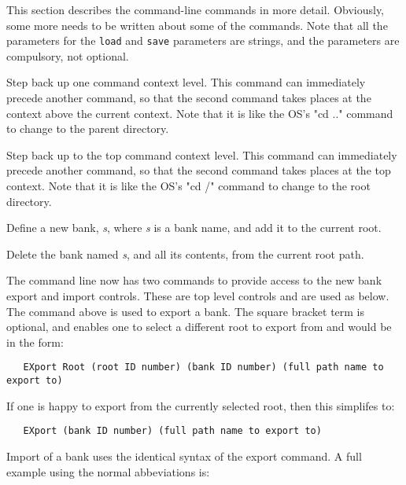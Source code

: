    This section describes the command-line commands in more detail.
   Obviously, some more needs to be written about some of the commands.
   Note that all the parameters for the \texttt{load} and \texttt{save}
   parameters are strings, and the parameters are compulsory, not optional.

   \setcounter{ItemCounter}{0}      %

      Step back up one command context level.
      This command can immediately precede another command, so that the second
      command takes places at the context above the current context.
      Note that it is like the OS's "cd .." command to change to the parent
      directory.

      Step back up to the top command context level.
      This command can immediately precede another command, so that the second
      command takes places at the top context.
      Note that it is like the OS's "cd /" command to change to the root
      directory.

      Define a new bank, \textsl{s}, where \textsl{s} is a bank name,
      and add it to the current root.

      Delete the bank named \textsl{s}, and all its contents,
      from the current root path.

      The command line now has two commands to provide access to the new bank
      export and import controls. These are top level controls and are used as
      below.  The command above is used to export a bank. The square bracket term
      is optional, and enables one to select a different root to export from and
      would be in the form:

\begin{verbatim}
   EXport Root (root ID number) (bank ID number) (full path name to export to)
\end{verbatim}

   If one is happy to export from the currently selected root, then this
   simplifes to:

\begin{verbatim}
   EXport (bank ID number) (full path name to export to)
\end{verbatim}

      Import of a bank uses the identical syntax of the export command.
      A full example using the normal abbeviations is:

